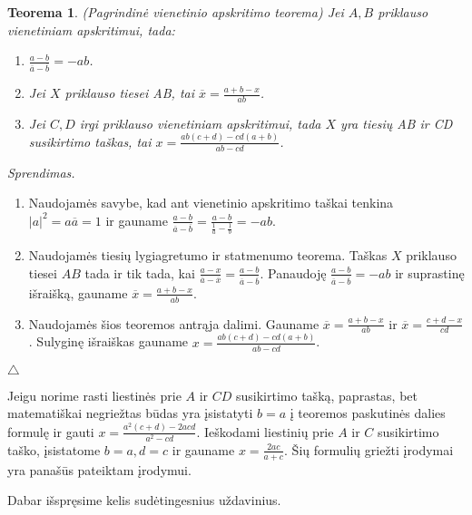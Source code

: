 \documentclass[11pt,a4paper,twoside]{book}
\newenvironment{sprendimas}{\noindent \textit{Sprendimas.}}{\hfill $\triangle$}
\newtheorem{thmnr}{Teorema}
\theoremstyle{definition} \newtheorem*{api}{Apibrėžimas}
\theoremstyle{remark} \newtheorem*{pastaba}{Pastaba}
\begin{document}
\begin{thmnr}  \textit{(Pagrindinė vienetinio apskritimo teorema)} Jei $A, B$ priklauso vienetiniam apskritimui, tada:\
\begin{enumerate}
\item $\frac{a - b}{\overline{a} -\overline{b}}=-ab$.
\item Jei $X$ priklauso tiesei AB, tai $\overline{x}=\frac{a + b - x}{ab}$.
\item Jei $C, D$ irgi priklauso vienetiniam apskritimui, tada $X$ yra tiesių AB ir CD susikirtimo taškas, tai $x=\frac{ab(c+d) - cd(a+b)}{ab - cd}$.
\end{enumerate}
\end{thmnr}
\begin{sprendimas}
\begin{enumerate} 
\item Naudojamės savybe, kad ant vienetinio apskritimo taškai tenkina $|a|^2=a\overline{a}=1$ ir gauname $\frac{a - b}{\overline{a} -\overline{b}}=\frac{a - b}{\frac{1}{a} -\frac{1}{b}}=-ab$.
\item Naudojamės tiesių lygiagretumo ir statmenumo teorema. Taškas $X$ priklauso tiesei $AB$ tada ir tik tada, kai $\frac{a-x}{\overline{a}-\overline{x}}=\frac{a-b}{\overline{a}-\overline{b}}$. Panaudoję $\frac{a - b}{\overline{a} -\overline{b}}=-ab$ ir suprastinę išraišką, gauname $\overline{x}=\frac{a + b - x}{ab}$.
\item Naudojamės šios teoremos antrąja dalimi. Gauname $\overline{x}=\frac{a + b - x}{ab}$ ir $\overline{x}=\frac{c+ d - x}{cd}$. Sulyginę išraiškas gauname $x=\frac{ab(c+d) - cd(a+b)}{ab - cd}$.
\end{enumerate}
\end{sprendimas}

Jeigu norime rasti liestinės prie $A$ ir $CD$ susikirtimo tašką, paprastas, bet matematiškai negriežtas būdas yra įsistatyti $b=a$ į teoremos paskutinės dalies formulę ir gauti $x=\frac{a^2(c+d) - 2acd}{a^2 - cd}$. Ieškodami liestinių prie $A$ ir $C$ susikirtimo taško, įsistatome $b=a, d=c$ ir gauname $x=\frac{2ac}{a+c}$. Šių formulių griežti įrodymai yra panašūs pateiktam įrodymui.
\bigskip

Dabar išspręsime kelis sudėtingesnius uždavinius.
\end{document}
